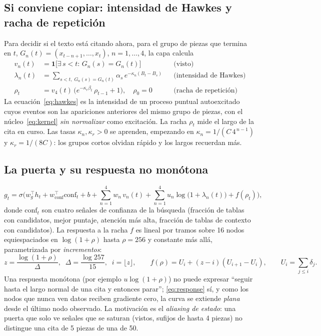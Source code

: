 \documentclass[11pt]{article}
\begin{document}
\subsection{Si conviene copiar: intensidad de Hawkes y racha de repetición}
\label{sec:repetition}
Para decidir si el texto está citando ahora, para el grupo de piezas que termina en $t$,
$G_n(t)=(x_{t-n+1},\dots,x_t)$, $n=1,\dots,4$, la capa calcula
\begin{align}
v_n(t)&=\mathbf{1}\big[\exists\,s<t:\,G_n(s)=G_n(t)\big] &&\text{(visto)}\\
\lambda_n(t)&=\sum_{s<t,\;G_n(s)=G_n(t)}\alpha_s\,e^{-\kappa_n(B_t-B_s)} &&\text{(intensidad de Hawkes)}\label{eq:hawkes}\\
\rho_t&=v_4(t)\,\big(e^{-\kappa_r\beta_t}\,\rho_{t-1}+1\big),\quad\rho_0=0 &&\text{(racha de repetición)}\label{eq:streak}
\end{align}
La ecuación~\eqref{eq:hawkes} es la intensidad de un proceso puntual autoexcitado~\cite{hawkes1971spectra} cuyos eventos
son las apariciones anteriores del mismo grupo de piezas, con el núcleo~\eqref{eq:kernel} \emph{sin normalizar} como
excitación. La racha $\rho_t$ mide el largo de la cita en curso. Las tasas $\kappa_n,\kappa_r>0$ se aprenden, empezando
en $\kappa_n=1/(C\,4^{\,n-1})$ y $\kappa_r=1/(8C)$: los grupos cortos olvidan rápido y los largos recuerdan más.

\subsection{La puerta y su respuesta no monótona}
\label{sec:gate}
\begin{equation}
g_t=\sigma\Big(w_g^\top h_t+w_{\mathrm{conf}}^\top\mathrm{conf}_t+b
+\sum_{n=1}^{4}w_n\,v_n(t)+\sum_{n=1}^{4}u_n\log\!\big(1+\lambda_n(t)\big)+f(\rho_t)\Big),
\end{equation}
donde $\mathrm{conf}_t$ son cuatro señales de confianza de la búsqueda (fracción de tablas con candidatos, mejor
puntaje, atención más alta, fracción de tablas de contexto con candidatos). La respuesta a la racha $f$ es lineal por
tramos sobre 16 nodos equiespaciados en $\log(1+\rho)$ hasta $\rho=256$ y constante más allá, parametrizada por
\emph{incrementos}:
\begin{equation}
z=\frac{\log(1+\rho)}{\Delta},\;\;\Delta=\frac{\log 257}{15},\;\;i=\lfloor z\rfloor,\qquad
f(\rho)=U_i+(z-i)(U_{i+1}-U_i),\qquad U_i=\sum_{j\le i}\delta_j .
\label{eq:response}
\end{equation}
Una respuesta monótona (por ejemplo $u\log(1+\rho)$) no puede expresar ``seguir hasta el largo normal de una cita y
entonces parar''; \eqref{eq:response} sí, y como los nodos que nunca ven datos reciben gradiente cero, la curva se
extiende \emph{plana} desde el último nodo observado. La motivación es el \emph{aliasing de estado}: una puerta que solo
ve señales que se saturan (vistos, sufijos de hasta 4 piezas) no distingue una cita de 5 piezas de una de 50.
\end{document}
